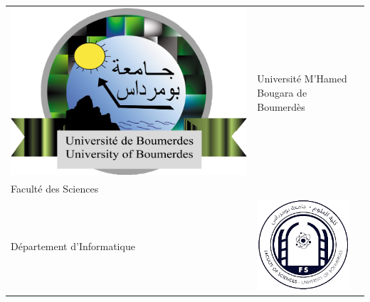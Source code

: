 \documentclass[14pt]{extarticle}
\begin{document}
\begin{titlepage}
    \begin{center}
    \begin{tabular}{m{} m{} m{}}
        \includegraphics[width=\linewidth]{umbb.png} &
        \centering
        { \small {Université M'Hamed Bougara de Boumerdès}}\\
        { \small {Faculté des Sciences}}\\
        { \small {Département d'Informatique}} &
        \includegraphics[width=\linewidth]{FS.png}
    \end{tabular}
\end{center}
    \vspace{4cm}


\end{titlepage}
\end{document}
